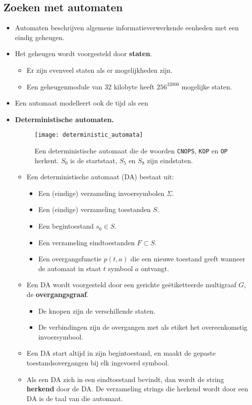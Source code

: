 \subsection{Zoeken met automaten}
\begin{itemize}
    \item Automaten beschrijven algemene informatieverwerkende eenheden met een eindig geheugen.
    \item Het geheugen wordt voorgesteld door \textbf{staten}.
    \begin{itemize}
        \item Er zijn evenveel staten als er mogelijkheden zijn.
        \item Een geheugenmodule van 32 kilobyte heeft $256^{32000}$ mogelijke staten.
    \end{itemize}
    \item Een automaat modelleert ook de tijd als een 

    \item \textbf{Deterministische automaten.}
    \begin{figure}[ht]
        \centering
        \texttt{[image: deterministic\_automata]}
        \caption{Een deterministische automaat die de woorden \texttt{CNOPS}, \texttt{KOP} en \texttt{OP} herkent. $S_0$ is de startstaat, $S_5$ en $S_8$ zijn eindstaten.}
        \label{fig:deterministic_automata}
    \end{figure}
    \begin{itemize}
        \item Een deterministische automaat (DA) bestaat uit:
        \begin{itemize}
            \item Een (eindige) verzameling invoersymbolen $\Sigma$.
            \item Een (eindige) verzameling toestanden $S$.
            \item Een begintoestand $s_0 \in S$.
            \item Een verzameling eindtoestanden $F \subset S$.
            \item Een overgangsfunctie $p(t, a)$ die een nieuwe toestand geeft wanneer de automaat in staat $t$ symbool $a$ ontvangt.
        \end{itemize}
        \item Een DA wordt voorgesteld door een gerichte geëtiketteerde multigraaf $G$, de \textbf{overgangsgraaf}.
        \begin{itemize}
            \item De knopen zijn de verschillende staten.
            \item De verbindingen zijn de overgangen met als etiket het overeenkomstig invoersymbool.
        \end{itemize}
        \item Een DA start altijd in zijn begintoestand, en maakt de gepaste toestandsovergangen bij elk ingevoerd symbool.
        \item Als een DA zich in een eindtoestand bevindt, dan wordt de string \textbf{herkend} door de DA. De verzameling strings die herkend wordt door een DA is de taal van die automaat.
    \end{itemize}


\end{itemize}
